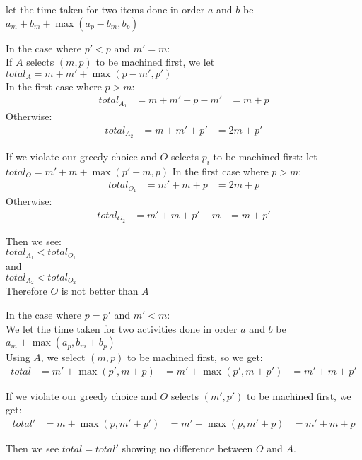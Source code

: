\documentclass{article}
\begin{document}
let the time taken for two items done in order $a$ and $b$ be $a_m + b_m + \max(a_p - b_m, b_p)$

In the case where $p' < p$ and $m' = m$:\\
If $A$ selects $(m, p)$ to be machined first, we let $total_A = m + m' + \max(p - m', p')$\\
In the first case where $p > m$:\\
\begin{align*}
    total_A_1 &= m + m' + p - m'
              &= m + p
\end{align*}
Otherwise:
\begin{align*}
    total_A_2 &= m + m' + p'
              &= 2m + p'
\end{align*}

If we violate our greedy choice and $O$ selects $p_i$ to be machined first:
let $total_O = m' + m + \max(p' - m, p)$
In the first case where $p > m$:
\begin{align*}
    total_O_1 &= m' + m + p
              &= 2m + p
\end{align*}
Otherwise:
\begin{align*}
    total_O_2 &= m' + m + p' - m
              &= m + p'
\end{align*}

Then we see:\\
$total_A_1 < total_O_1$\\
and\\
$total_A_2 < total_O_2$\\
Therefore $O$ is not better than $A$

In the case where $p = p'$ and $m' < m$:\\
We let the time taken for two activities done in order $a$ and $b$ be $a_m + \max(a_p, b_m + b_p)$\\
Using $A$, we select $(m, p)$ to be machined first, so we get:
\begin{align*}
    total &= m' + \max(p', m + p)
          &= m' + \max(p', m + p')
          &= m' + m + p'
\end{align*}

If we violate our greedy choice and $O$ selects $(m', p')$ to be machined first, we get:
\begin{align*}
    total' &= m + \max(p, m' + p')
           &= m' + \max(p, m' + p)
           &= m' + m + p
\end{align*}

Then we see $total = total'$ showing no difference between $O$ and $A$.
\end{document}
